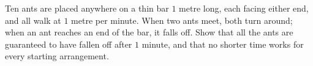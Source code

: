 Ten ants are placed anywhere on a thin bar $1$ metre long, each facing either end, and all walk at $1$ metre per minute. When two ants meet, both turn around; when an ant reaches an end of the bar, it falls off. Show that all the ants are guaranteed to have fallen off after $1$ minute, and that no shorter time works for every starting arrangement.
